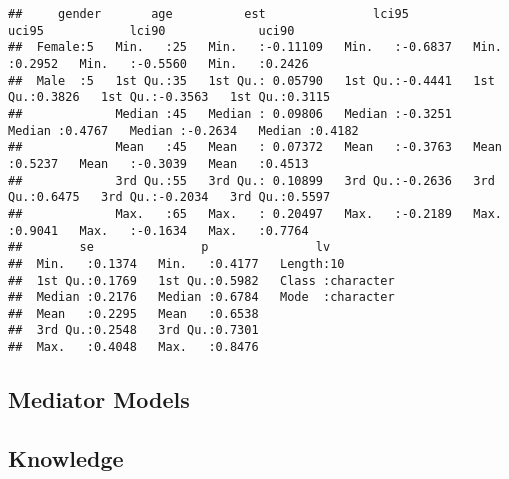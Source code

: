 \documentclass[
]{article}
\begin{document}
\begin{verbatim}
##     gender       age          est               lci95             uci95            lci90             uci90       
##  Female:5   Min.   :25   Min.   :-0.11109   Min.   :-0.6837   Min.   :0.2952   Min.   :-0.5560   Min.   :0.2426  
##  Male  :5   1st Qu.:35   1st Qu.: 0.05790   1st Qu.:-0.4441   1st Qu.:0.3826   1st Qu.:-0.3563   1st Qu.:0.3115  
##             Median :45   Median : 0.09806   Median :-0.3251   Median :0.4767   Median :-0.2634   Median :0.4182  
##             Mean   :45   Mean   : 0.07372   Mean   :-0.3763   Mean   :0.5237   Mean   :-0.3039   Mean   :0.4513  
##             3rd Qu.:55   3rd Qu.: 0.10899   3rd Qu.:-0.2636   3rd Qu.:0.6475   3rd Qu.:-0.2034   3rd Qu.:0.5597  
##             Max.   :65   Max.   : 0.20497   Max.   :-0.2189   Max.   :0.9041   Max.   :-0.1634   Max.   :0.7764  
##        se               p               lv           
##  Min.   :0.1374   Min.   :0.4177   Length:10         
##  1st Qu.:0.1769   1st Qu.:0.5982   Class :character  
##  Median :0.2176   Median :0.6784   Mode  :character  
##  Mean   :0.2295   Mean   :0.6538                     
##  3rd Qu.:0.2548   3rd Qu.:0.7301                     
##  Max.   :0.4048   Max.   :0.8476
\end{verbatim}

\hypertarget{mediator-models-2}{%
\subsection{Mediator Models}\label{mediator-models-2}}

\hypertarget{knowledge-2}{%
\subsection{Knowledge}\label{knowledge-2}}
\end{document}
